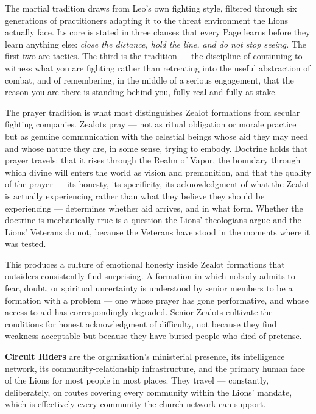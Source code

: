 The martial tradition draws from Leo's own fighting style, filtered through six generations of practitioners adapting it to the threat environment the Lions actually face. Its core is stated in three clauses that every Page learns before they learn anything else: \textit{close the distance, hold the line, and do not stop seeing.} The first two are tactics. The third is the tradition --- the discipline of continuing to witness what you are fighting rather than retreating into the useful abstraction of combat, and of remembering, in the middle of a serious engagement, that the reason you are there is standing behind you, fully real and fully at stake.

The prayer tradition is what most distinguishes Zealot formations from secular fighting companies. Zealots pray --- not as ritual obligation or morale practice but as genuine communication with the celestial beings whose aid they may need and whose nature they are, in some sense, trying to embody. Doctrine holds that prayer travels: that it rises through the Realm of Vapor, the boundary through which divine will enters the world as vision and premonition, and that the quality of the prayer --- its honesty, its specificity, its acknowledgment of what the Zealot is actually experiencing rather than what they believe they should be experiencing --- determines whether aid arrives, and in what form. Whether the doctrine is mechanically true is a question the Lions' theologians argue and the Lions' Veterans do not, because the Veterans have stood in the moments where it was tested.

This produces a culture of emotional honesty inside Zealot formations that outsiders consistently find surprising. A formation in which nobody admits to fear, doubt, or spiritual uncertainty is understood by senior members to be a formation with a problem --- one whose prayer has gone performative, and whose access to aid has correspondingly degraded. Senior Zealots cultivate the conditions for honest acknowledgment of difficulty, not because they find weakness acceptable but because they have buried people who died of pretense.

\textbf{Circuit Riders} are the organization's ministerial presence, its intelligence network, its community-relationship infrastructure, and the primary human face of the Lions for most people in most places. They travel --- constantly, deliberately, on routes covering every community within the Lions' mandate, which is effectively every community the church network can support.

